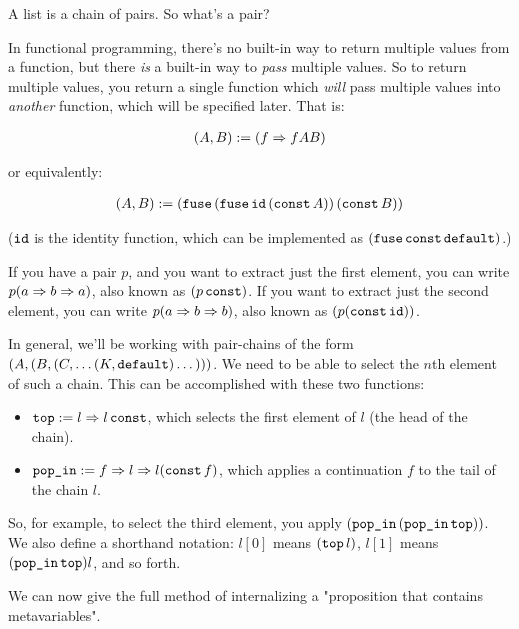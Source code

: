 \documentclass{article}
\begin{document}
  A list is a chain of pairs. So what's a pair?
  
  In functional programming, there's no built-in way to return multiple values from a function, but there \emph{is} a built-in way to \emph{pass} multiple values. So to return multiple values, you return a single function which \emph{will} pass multiple values into \emph{another} function, which will be specified later. That is:
  
  \begin{align*}
    (A, B) &:= (f \Rightarrow f A B)\\
  \end{align*}
  
  or equivalently:
  
  \begin{align*}
    (A, B) &:= (\operatorname{\texttt{fuse}}\, (\operatorname{\texttt{fuse}} \operatorname{\texttt{id}}\, (\operatorname{\texttt{const}} A))\, (\operatorname{\texttt{const}} B))\\
  \end{align*}
  
  ($\operatorname{\texttt{id}}$ is the identity function, which can be implemented as $(\operatorname{\texttt{fuse}}\operatorname{\texttt{const}}\operatorname{\texttt{default}})$.)
  
  If you have a pair $p$, and you want to extract just the first element, you can write $p(a \Rightarrow b \Rightarrow a)$, also known as $(p \operatorname{\texttt{const}})$. If you want to extract just the second element, you can write $p(a \Rightarrow b \Rightarrow b)$, also known as $(p (\operatorname{\texttt{const}} \operatorname{\texttt{id}}))$.
  
  In general, we'll be working with pair-chains of the form $(A, (B, (C, \dots (K, \operatorname{\texttt{default}}) \dots)))$. We need to be able to select the $n$th element of such a chain. This can be accomplished with these two functions:
  
  \begin{itemize}
    \item $\operatorname{\texttt{top}} := l \Rightarrow l \operatorname{\texttt{const}}$, which selects the first element of $l$ (the head of the chain).
    \item $\operatorname{\texttt{pop\_in}} := f \Rightarrow l \Rightarrow l (\operatorname{\texttt{const}} f)$, which applies a continuation $f$ to the tail of the chain $l$.
  \end{itemize}
  
  So, for example, to select the third element, you apply $(\operatorname{\texttt{pop\_in}}\, (\operatorname{\texttt{pop\_in}} \operatorname{\texttt{top}}))$. We also define a shorthand notation: $l[0]$ means $(\operatorname{\texttt{top}} l)$, $l[1]$ means $(\operatorname{\texttt{pop\_in}} \operatorname{\texttt{top}}) l$, and so forth.

  We can now give the full method of internalizing a "proposition that contains metavariables".
  
\end{document}
